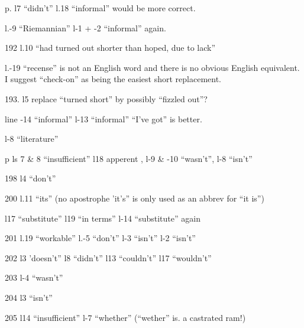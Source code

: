 

p. l7 ``didn't'' l.18 ``informal'' would be more correct.

l.-9 ``Riemannian'' l-1 + -2 ``informal'' again.

192 l.10 ``had turned out shorter than hoped, due to lack''

l.-19 ``recense'' is not an English word and there is no obvious English equivalent. I suggest ``check-on'' as being the easiest short replacement.

193. l5  replace ``turned short'' by possibly ``fizzled out''?

\reversemarginpar{} line -14 ``informal'' l-13 ``informal''
``I've got'' is better.

l-8 ``literature''

p ls 7 \& 8 ``insufficient'' l18 apperent , l-9 \& -10 ``wasn't'', l-8 ``isn't''

198 l4 ``don't''

200 l.11 ``its'' (no apostrophe 'it's'' is only used as an abbrev for ``it is'')

l17 ``substitute'' l19 ``in terms'' l-14 ``substitute'' again

201 l.19 ``workable'' l.-5 ``don't'' l-3 ``isn't'' l-2 ``isn't''

202 l3 'doesn't'' l8 ``didn't'' l13 ``couldn't'' l17 ``wouldn't''

203 l-4 ``wasn't''

204 l3 ``isn't''

205 l14 ``insufficient'' l-7 ``whether'' (``wether'' is. a castrated ram!)

